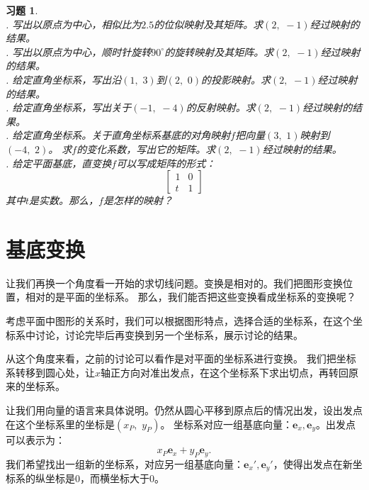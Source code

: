 \documentclass[12pt,UTF8]{ctexbook}
\newtheorem{xt}{习题}[section]
\begin{document}
\begin{xt}
    \mbox{} \\
    . 写出以原点为中心，相似比为$2.5$的位似映射及其矩阵。求$(2,\,\,-1)$经过映射的结果。\\
    . 写出以原点为中心，顺时针旋转$90^\circ$的旋转映射及其矩阵。求$(2,\,\,-1)$经过映射的结果。\\
    . 给定直角坐标系，写出沿$(1,\,\,3)$到$(2,\,\,0)$的投影映射。求$(2,\,\,-1)$经过映射的结果。\\
    . 给定直角坐标系，写出关于$(-1,\,\,-4)$的反射映射。求$(2,\,\,-1)$经过映射的结果。\\
    . 给定直角坐标系。关于直角坐标系基底的对角映射$f$把向量$(3,\,\,1)$映射到$(-4,\,\,2)$。
               求$f$的变化系数，写出它的矩阵。求$(2,\,\,-1)$经过映射的结果。\\
    . 给定平面基底，直变换$f$可以写成矩阵的形式：
                $$
                \begin{bmatrix}
                    1 & 0 \\ t & 1
                \end{bmatrix}
                $$
                其中$t$是实数。那么，$f$是怎样的映射？
\end{xt}

\section{基底变换}

让我们再换一个角度看一开始的求切线问题。变换是相对的。我们把图形变换位置，相对的是平面的坐标系。
那么，我们能否把这些变换看成坐标系的变换呢？

考虑平面中图形的关系时，我们可以根据图形特点，选择合适的坐标系，在这个坐标系中讨论，讨论完毕后再变换到另一个坐标系，展示讨论的结果。

从这个角度来看，之前的讨论可以看作是对平面的坐标系进行变换。
我们把坐标系转移到圆心处，让$x$轴正方向对准出发点，在这个坐标系下求出切点，再转回原来的坐标系。

让我们用向量的语言来具体说明。仍然从圆心平移到原点后的情况出发，设出发点在这个坐标系里的坐标是$(x_P,\,\,y_P)$。
坐标系对应一组基底向量：$\mathbf{e}_x, \mathbf{e}_y$。出发点可以表示为：
$$ x_P\mathbf{e}_x + y_P\mathbf{e}_y. $$
我们希望找出一组新的坐标系，对应另一组基底向量：$\mathbf{e}_x', \mathbf{e}_y'$，使得出发点在新坐标系的纵坐标是$0$，而横坐标大于$0$。
\end{document}
